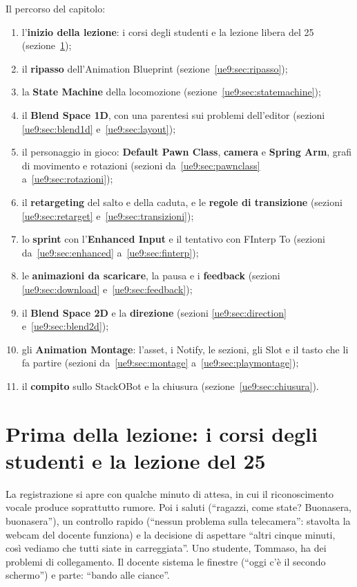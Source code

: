Il percorso del capitolo:
\begin{enumerate}
  \item l'\textbf{inizio della lezione}: i corsi degli studenti e la lezione libera del
        25 (sezione~\ref{ue9:sec:inizio});
  \item il \textbf{ripasso} dell'Animation Blueprint (sezione~\ref{ue9:sec:ripasso});
  \item la \textbf{State Machine} della locomozione (sezione~\ref{ue9:sec:statemachine});
  \item il \textbf{Blend Space 1D}, con una parentesi sui problemi dell'editor (sezioni
        \ref{ue9:sec:blend1d} e~\ref{ue9:sec:layout});
  \item il personaggio in gioco: \textbf{Default Pawn Class}, \textbf{camera} e
        \textbf{Spring Arm}, grafi di movimento e rotazioni (sezioni
        da~\ref{ue9:sec:pawnclass} a~\ref{ue9:sec:rotazioni});
  \item il \textbf{retargeting} del salto e della caduta, e le \textbf{regole di
        transizione} (sezioni \ref{ue9:sec:retarget} e~\ref{ue9:sec:transizioni});
  \item lo \textbf{sprint} con l'\textbf{Enhanced Input} e il tentativo con FInterp To
        (sezioni da~\ref{ue9:sec:enhanced} a~\ref{ue9:sec:finterp});
  \item le \textbf{animazioni da scaricare}, la pausa e i \textbf{feedback} (sezioni
        \ref{ue9:sec:download} e~\ref{ue9:sec:feedback});
  \item il \textbf{Blend Space 2D} e la \textbf{direzione} (sezioni
        \ref{ue9:sec:direction} e~\ref{ue9:sec:blend2d});
  \item gli \textbf{Animation Montage}: l'asset, i Notify, le sezioni, gli Slot e il
        tasto che li fa partire (sezioni da~\ref{ue9:sec:montage}
        a~\ref{ue9:sec:playmontage});
  \item il \textbf{compito} sullo StackOBot e la chiusura
        (sezione~\ref{ue9:sec:chiusura}).
\end{enumerate}

\section{Prima della lezione: i corsi degli studenti e la lezione del 25}
\label{ue9:sec:inizio}

La registrazione si apre con qualche minuto di attesa, in cui il riconoscimento vocale
produce soprattutto rumore. Poi i saluti (``ragazzi, come state? Buonasera, buonasera''),
un controllo rapido (``nessun problema sulla telecamera'': stavolta la webcam del docente
funziona) e la decisione di aspettare ``altri cinque minuti, così vediamo che tutti siate
in carreggiata''. Uno studente, Tommaso, ha dei problemi di collegamento. Il docente
sistema le finestre (``oggi c'è il secondo schermo'') e parte: ``bando alle ciance''.

